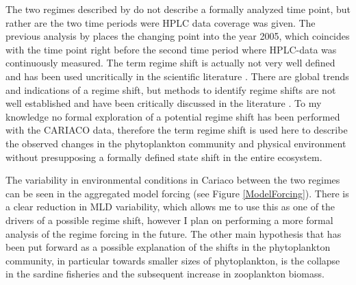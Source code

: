 The two regimes described by \citet{Pinckney2015} do not describe a formally analyzed time point, but rather are the two time periods were HPLC data coverage was given. The previous analysis by \citet{Taylor2012} places the changing point into the year 2005, which coincides with the time point right before the second time period where HPLC-data was continuously measured. 
The term regime shift is actually not very well defined and has been used uncritically in the scientific literature \citep{DeYoung2004a}. There are global trends and indications of a regime shift, but methods to identify regime shifts are not well established and have been critically discussed in the literature \citep{Steele2004a, Mantua2004a, Litzow2016a}. To my knowledge no formal exploration of a potential regime shift has been performed with the CARIACO data, therefore the term regime shift is used here to describe the observed changes in the phytoplankton community and physical environment without presupposing a formally defined state shift in the entire ecosystem. 

The variability in environmental conditions in Cariaco between the two regimes can be seen in the aggregated model forcing
 (see Figure \ref{ModelForcing}).
  There is a clear reduction in MLD variability, which allows me to use this as one of the drivers of a possible regime shift, however I plan on performing a more formal analysis of the regime forcing in the future. 
  The other main hypothesis 
  that has been put forward as a possible explanation of the shifts in the phytoplankton community, in particular towards smaller sizes of phytoplankton, is the collapse in the sardine fisheries and the subsequent increase in zooplankton biomass. 

